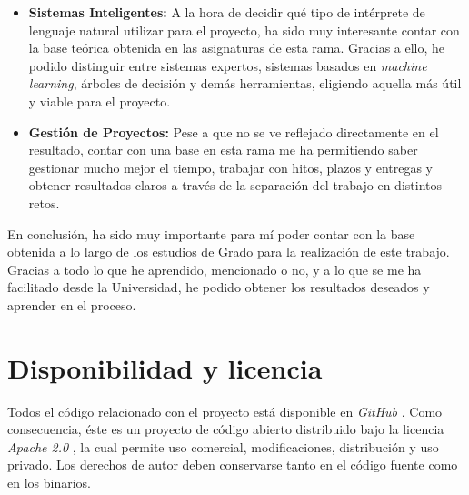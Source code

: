 \documentclass[11pt,spanish,listoffigures]{tfgetsinf}
\begin{document}
\begin{itemize}
\item \textbf{Sistemas Inteligentes:} A la hora de decidir qué tipo de intérprete de lenguaje natural utilizar para el proyecto, ha sido muy interesante contar con la base teórica obtenida en las asignaturas de esta rama. Gracias a ello, he podido distinguir entre sistemas expertos, sistemas basados en \textit{machine learning}, árboles de decisión y demás herramientas, eligiendo aquella más útil y viable para el proyecto.

\item \textbf{Gestión de Proyectos:} Pese a que no se ve reflejado directamente en el resultado, contar con una base en esta rama me ha permitiendo saber gestionar mucho mejor el tiempo, trabajar con hitos, plazos y entregas y obtener resultados claros a través de la separación del trabajo en distintos retos.

\end{itemize}

En conclusión, ha sido muy importante para mí poder contar con la base obtenida a lo largo de los estudios de Grado para la realización de este trabajo. Gracias a todo lo que he aprendido, mencionado o no, y a lo que se me ha facilitado desde la Universidad, he podido obtener los resultados deseados y aprender en el proceso.

\section{Disponibilidad y licencia}

Todos el código relacionado con el proyecto está disponible en \textit{GitHub} \cite{ptolomeo}. Como consecuencia, éste es un proyecto de código abierto distribuido bajo la licencia \textit{Apache 2.0} \cite{apache}, la cual permite uso comercial, modificaciones, distribución y uso privado. Los derechos de autor deben conservarse tanto en el código fuente como en los binarios.



\printglossary[title=Glosario]



\end{document}
